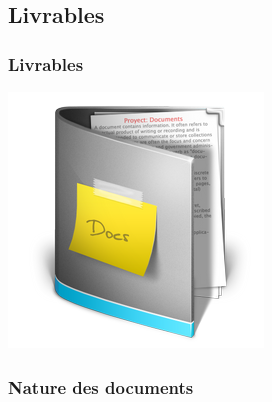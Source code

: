 \subsection{Livrables}
\begin{frame}
	\frametitle{Livrables}
	\begin{center}
	 \includegraphics[scale=0.5]{Images/livrables}
	\end{center}
\end{frame}


\subsubsection[Nature des documents]{Nature des documents}

